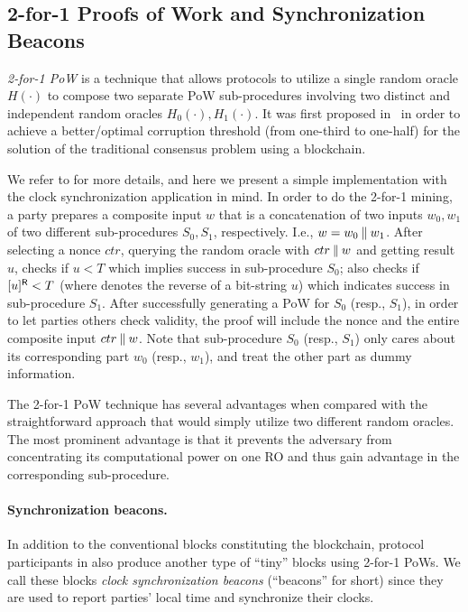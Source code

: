 \subsection{2-for-1 Proofs of Work and Synchronization Beacons}
\label{subsec:2-for-1-pow-sync-beacons}

\emph{2-for-1 PoW} is a technique that allows protocols to utilize a single random oracle $H(\cdot)$ to compose two separate PoW sub-procedures involving two distinct and independent random oracles $H_0(\cdot), H_1(\cdot)$.
%
It was first proposed in~\cite{EC:GarKiaLeo15} in order to achieve a better/optimal corruption threshold (from one-third to one-half) for the solution of the traditional consensus problem using a blockchain.

We refer to \cite{EC:GarKiaLeo15} for more details, and here we present a simple implementation with the clock synchronization application in mind.
%
In order to do the 2-for-1 mining, a party \party prepares a composite input $w$ that is a concatenation of two inputs $w_0, w_1$ of two different sub-procedures $S_0, S_1$, respectively.
%
I.e., $w = w_0 \mathbin\Vert w_1$.
%
After selecting a nonce $ctr$, querying the random oracle with $ctr \mathbin\Vert w$ and getting result $u$, \party checks if $u < T$ which implies success in sub-procedure $S_0$; \party also checks if $[u]^{\mathsf{R}} < T$ (where  denotes the reverse of a bit-string $u$) which indicates success in sub-procedure $S_1$.
%
After successfully generating a PoW for $S_0$ (resp., $S_1$), in order to let parties others check validity, the proof will include the nonce and the entire composite input $ctr \mathbin\Vert w$.
%
Note that sub-procedure $S_0$ (resp., $S_1$) only cares about its corresponding part $w_0$ (resp., $w_1$), and treat the other part as dummy information.

The 2-for-1 PoW technique has several advantages when compared with the straightforward approach that would simply utilize two different random oracles.
%
The most prominent advantage is that it prevents the adversary \adv from concentrating its computational power on one RO and thus gain advantage in the corresponding sub-procedure.

\paragraph{Synchronization beacons.}
%
In addition to the conventional blocks constituting the blockchain, protocol participants in \timekeeper also produce another type of ``tiny'' blocks using 2-for-1 PoWs.
%
We call these blocks \emph{clock synchronization beacons} (``beacons'' for short) since they are used to report parties' local time and synchronize their clocks.

